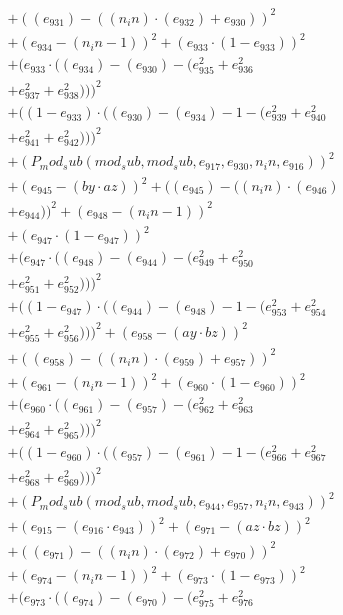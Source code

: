 \documentclass[10pt, a4paper]{article}
\begin{document}
\begin{small}
\begin{align*}
& + ((e_{931}) - ((n_in)  \cdot  (e_{932}) + e_{930}))^{2} \\
& + (e_{934} - (n_in - 1))^{2} + (e_{933}  \cdot  (1 - e_{933}))^{2} \\
& + (e_{933}  \cdot  ((e_{934}) - (e_{930}) - (e_{935}^{2} + e_{936}^{2} \\
& + e_{937}^{2} + e_{938}^{2})))^{2} \\
& + ((1 - e_{933})  \cdot  ((e_{930}) - (e_{934}) - 1 - (e_{939}^{2} + e_{940}^{2} \\
& + e_{941}^{2} + e_{942}^{2})))^{2} \\
& + (P_mod_sub(mod_sub, mod_sub, e_{917}, e_{930}, n_in, e_{916}))^{2} \\
& + (e_{945} - (by  \cdot  az))^{2} + ((e_{945}) - ((n_in)  \cdot  (e_{946}) \\
& + e_{944}))^{2} + (e_{948} - (n_in - 1))^{2} \\
& + (e_{947}  \cdot  (1 - e_{947}))^{2} \\
& + (e_{947}  \cdot  ((e_{948}) - (e_{944}) - (e_{949}^{2} + e_{950}^{2} \\
& + e_{951}^{2} + e_{952}^{2})))^{2} \\
& + ((1 - e_{947})  \cdot  ((e_{944}) - (e_{948}) - 1 - (e_{953}^{2} + e_{954}^{2} \\
& + e_{955}^{2} + e_{956}^{2})))^{2} + (e_{958} - (ay  \cdot  bz))^{2} \\
& + ((e_{958}) - ((n_in)  \cdot  (e_{959}) + e_{957}))^{2} \\
& + (e_{961} - (n_in - 1))^{2} + (e_{960}  \cdot  (1 - e_{960}))^{2} \\
& + (e_{960}  \cdot  ((e_{961}) - (e_{957}) - (e_{962}^{2} + e_{963}^{2} \\
& + e_{964}^{2} + e_{965}^{2})))^{2} \\
& + ((1 - e_{960})  \cdot  ((e_{957}) - (e_{961}) - 1 - (e_{966}^{2} + e_{967}^{2} \\
& + e_{968}^{2} + e_{969}^{2})))^{2} \\
& + (P_mod_sub(mod_sub, mod_sub, e_{944}, e_{957}, n_in, e_{943}))^{2} \\
& + (e_{915} - (e_{916}  \cdot  e_{943}))^{2} + (e_{971} - (az  \cdot  bz))^{2} \\
& + ((e_{971}) - ((n_in)  \cdot  (e_{972}) + e_{970}))^{2} \\
& + (e_{974} - (n_in - 1))^{2} + (e_{973}  \cdot  (1 - e_{973}))^{2} \\
& + (e_{973}  \cdot  ((e_{974}) - (e_{970}) - (e_{975}^{2} + e_{976}^{2} \\

\end{align*}
\end{small}
\end{document}
